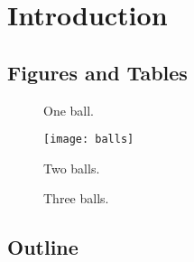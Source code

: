 \chapter{Introduction}
\label{sec:intro}

\kant[4] %



\section{Figures and Tables}

\begin{figure}[htbp]
    \centering
    
    \caption[One ball]{One ball.}
\end{figure}

\begin{figure}[thbp]
    \centering
    \texttt{[image: balls]}
    \caption[Two balls]{Two balls.}
\end{figure}

\begin{figure}[hbp]
    \centering
    \caption[Three balls]{Three balls.}
\end{figure}

\kant[5-6] %




\section{Outline}

